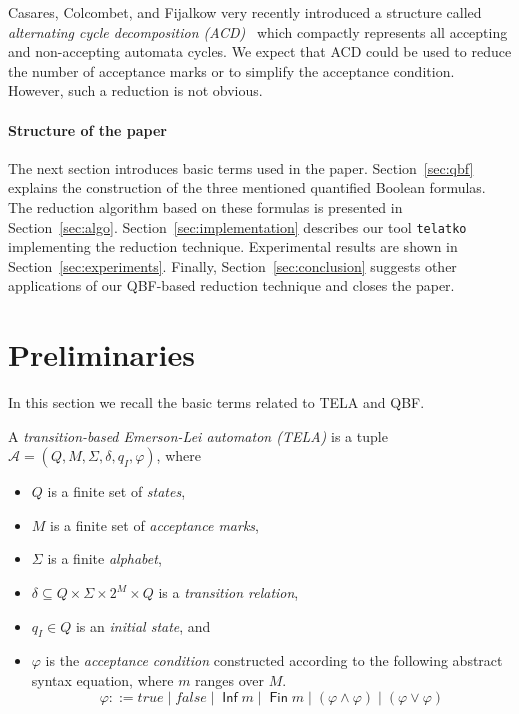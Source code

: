 \documentclass[a4paper,UKenglish,cleveref,autoref,thm-restate]{lipics-v2021}
\DeclareMathOperator{\Inf}{\mathsf{Inf}}
\DeclareMathOperator{\Fin}{\mathsf{Fin}}
\def\false{\mathit{false}}
\def\true{\mathit{true}}
\newcommand{\mA}{\mathcal{A}}
\newcommand{\telatko}{\texttt{telatko}\xspace}
\begin{document}
Casares, Colcombet, and Fijalkow very recently introduced a structure
called \emph{alternating cycle decomposition
  (ACD)}~\cite{casares.21.icalp} which compactly represents
all accepting and non-accepting automata cycles. We
expect that ACD could %
be used to reduce the number of
acceptance marks or to simplify the acceptance condition. However,
such a reduction is not obvious.

\paragraph*{Structure of the paper} The next section introduces basic
terms used in the paper. Section~\ref{sec:qbf} explains the
construction of the three mentioned quantified Boolean formulas. The
reduction algorithm based on these formulas is presented in
Section~\ref{sec:algo}. Section~\ref{sec:implementation} describes our
tool \telatko implementing the reduction technique.  Experimental
results are shown in Section~\ref{sec:experiments}. Finally,
Section~\ref{sec:conclusion} suggests other applications of our
QBF-based reduction technique and closes the paper.


\section{Preliminaries}\label{sec:prelim}

In this section we recall the basic terms related to TELA and QBF.

\begin{definition}[TELA]
  A \emph{transition-based Emerson-Lei automaton (TELA)} is a tuple
  $\mA =(Q,M,\Sigma,\delta,q_I,\varphi)$, where
  \begin{itemize}
  \item $Q$ is a finite set of \emph{states},
  \item $M$ is a finite set of \emph{acceptance marks},
  \item $\Sigma$ is a finite \emph{alphabet},
  \item $\delta \subseteq Q \times \Sigma \times 2^{M} \times Q$ is a
    \emph{transition relation},
  \item $q_I\in Q$ is an \emph{initial state}, and
  \item $\varphi$ is the \emph{acceptance condition} constructed
    according to the following abstract syntax equation, where $m$
    ranges over $M$.
    $$\varphi ::= \true \mid \false \mid \Inf m \mid \Fin m \mid \left( \varphi \land \varphi \right) \mid \left( \varphi \lor \varphi \right)$$
\end{itemize}
\end{definition}
\end{document}
